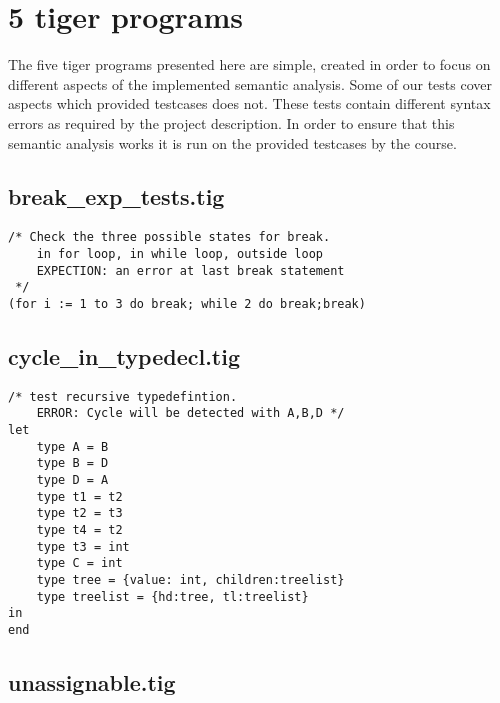 \documentclass{article}
\begin{document}
\section{5 tiger programs}

The five tiger programs presented here are simple, created in order to focus on different aspects of the implemented semantic analysis. Some of our tests cover aspects
which provided testcases does not. These tests contain different syntax errors as required by the project description. In order to ensure that this semantic analysis works it is run on the provided testcases by the course. 


\subsection{break\_exp\_tests.tig}

\begin{lstlisting}[frame=single]
/* Check the three possible states for break.
	in for loop, in while loop, outside loop
	EXPECTION: an error at last break statement
 */
(for i := 1 to 3 do break; while 2 do break;break)
\end{lstlisting}

\subsection{cycle\_in\_typedecl.tig}

\begin{lstlisting}[frame=single]
/* test recursive typedefintion.
	ERROR: Cycle will be detected with A,B,D */
let
	type A = B
	type B = D
	type D = A
	type t1 = t2
	type t2 = t3
	type t4 = t2
	type t3 = int
	type C = int
	type tree = {value: int, children:treelist}
	type treelist = {hd:tree, tl:treelist}
in 
end
\end{lstlisting}

\subsection{unassignable.tig}
\end{document}
